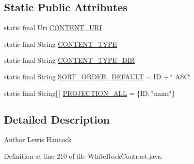 \subsection*{Static Public Attributes}
\begin{DoxyCompactItemize}
\item 
static final Uri \hyperlink{classuk_1_1ac_1_1swan_1_1digitaltrails_1_1database_1_1_white_rock_contract_1_1_setting_type_a3041c935f6d354bc72de5e4b1867aa3d}{C\+O\+N\+T\+E\+N\+T\+\_\+\+U\+R\+I}
\item 
static final String \hyperlink{classuk_1_1ac_1_1swan_1_1digitaltrails_1_1database_1_1_white_rock_contract_1_1_setting_type_a4e66cbc4161ad257d66a4e86f0c97d65}{C\+O\+N\+T\+E\+N\+T\+\_\+\+T\+Y\+P\+E}
\item 
static final String \hyperlink{classuk_1_1ac_1_1swan_1_1digitaltrails_1_1database_1_1_white_rock_contract_1_1_setting_type_ac7367e46dd41f60b82a380357959fc2e}{C\+O\+N\+T\+E\+N\+T\+\_\+\+T\+Y\+P\+E\+\_\+\+D\+I\+R}
\item 
static final String \hyperlink{classuk_1_1ac_1_1swan_1_1digitaltrails_1_1database_1_1_white_rock_contract_1_1_setting_type_ac9a5bda284d029af4ab32b609521b37f}{S\+O\+R\+T\+\_\+\+O\+R\+D\+E\+R\+\_\+\+D\+E\+F\+A\+U\+L\+T} = I\+D + \char`\"{} A\+S\+C\char`\"{}
\item 
static final String\mbox{[}$\,$\mbox{]} \hyperlink{classuk_1_1ac_1_1swan_1_1digitaltrails_1_1database_1_1_white_rock_contract_1_1_setting_type_a634a057f05783b12c2f3f53a022fbee3}{P\+R\+O\+J\+E\+C\+T\+I\+O\+N\+\_\+\+A\+L\+L} = \{I\+D, \char`\"{}name\char`\"{}\}
\end{DoxyCompactItemize}


\subsection{Detailed Description}
\begin{DoxyAuthor}{Author}
Lewis Hancock 
\end{DoxyAuthor}


Definition at line 210 of file White\+Rock\+Contract.\+java.



